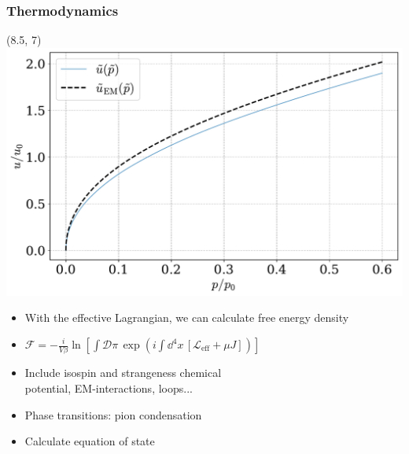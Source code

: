 \documentclass[aspectratio=169]{beamer}
\begin{document}
    \begin{frame}
        \frametitle{Thermodynamics}

        \begin{textblock}{7}(8.5, 7)
            \includegraphics[width=\textwidth]{../../scripts/figurer/pion_star/pion_eos_EM.pdf}
        \end{textblock}
         
        \begin{itemize}
            \itemsep 0.4cm
            \item With the effective Lagrangian, we can calculate free energy density
            \item $
            \mathcal{F}
            = -\frac{i}{V \beta} 
            \ln\left[
                 \int \mathcal D \pi \, \exp
                 \left(
                    i \int \dd^4x \, [\mathcal{L}_\text{eff} + \mu J]
                 \right)
            \right]
            $
            \item Include isospin and strangeness chemical \\
            potential, EM-interactions, loops...
            \item Phase transitions: pion condensation
            \item Calculate equation of state
        \end{itemize}
    \end{frame}
\end{document}
